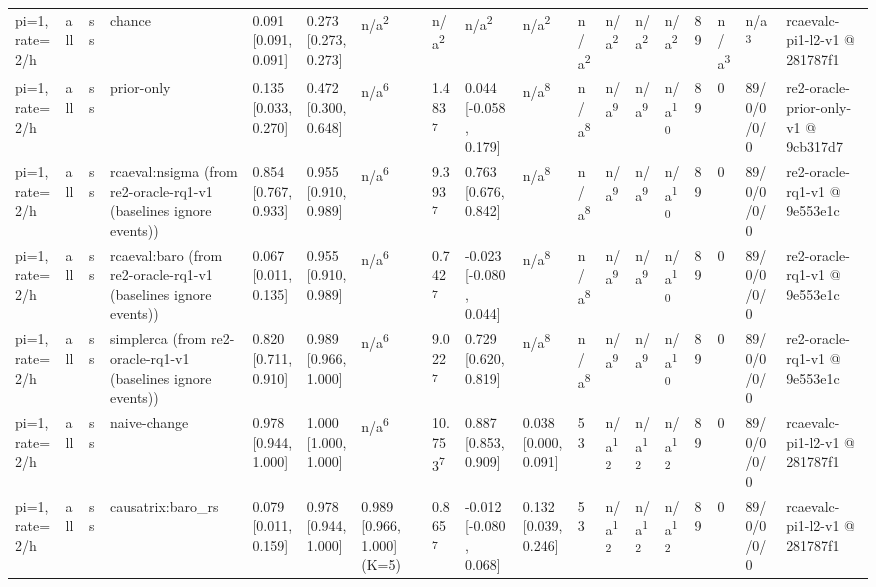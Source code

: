 \begin{table}[t]
\begin{tabular}{llllllllllllllllll}
pi=1, rate=2/h & all & ss & chance & 0.091 [0.091, 0.091] & 0.273 [0.273, 0.273] & n/a\textsuperscript{2} & n/a\textsuperscript{2} & n/a\textsuperscript{2} & n/a\textsuperscript{2} & n/a\textsuperscript{2} & n/a\textsuperscript{2} & n/a\textsuperscript{2} & n/a\textsuperscript{2} & 89 & n/a\textsuperscript{3} & n/a\textsuperscript{3} & rcaevalc-pi1-l2-v1 @ 281787f1 \\
pi=1, rate=2/h & all & ss & prior-only & 0.135 [0.033, 0.270] & 0.472 [0.300, 0.648] & n/a\textsuperscript{6} & 1.483\textsuperscript{7} & 0.044 [-0.058, 0.179] & n/a\textsuperscript{8} & n/a\textsuperscript{8} & n/a\textsuperscript{9} & n/a\textsuperscript{9} & n/a\textsuperscript{10} & 89 & 0 & 89/0/0/0/0 & re2-oracle-prior-only-v1 @ 9cb317d7 \\
pi=1, rate=2/h & all & ss & rcaeval:nsigma (from re2-oracle-rq1-v1 (baselines ignore events)) & 0.854 [0.767, 0.933] & 0.955 [0.910, 0.989] & n/a\textsuperscript{6} & 9.393\textsuperscript{7} & 0.763 [0.676, 0.842] & n/a\textsuperscript{8} & n/a\textsuperscript{8} & n/a\textsuperscript{9} & n/a\textsuperscript{9} & n/a\textsuperscript{10} & 89 & 0 & 89/0/0/0/0 & re2-oracle-rq1-v1 @ 9e553e1c \\
pi=1, rate=2/h & all & ss & rcaeval:baro (from re2-oracle-rq1-v1 (baselines ignore events)) & 0.067 [0.011, 0.135] & 0.955 [0.910, 0.989] & n/a\textsuperscript{6} & 0.742\textsuperscript{7} & -0.023 [-0.080, 0.044] & n/a\textsuperscript{8} & n/a\textsuperscript{8} & n/a\textsuperscript{9} & n/a\textsuperscript{9} & n/a\textsuperscript{10} & 89 & 0 & 89/0/0/0/0 & re2-oracle-rq1-v1 @ 9e553e1c \\
pi=1, rate=2/h & all & ss & simplerca (from re2-oracle-rq1-v1 (baselines ignore events)) & 0.820 [0.711, 0.910] & 0.989 [0.966, 1.000] & n/a\textsuperscript{6} & 9.022\textsuperscript{7} & 0.729 [0.620, 0.819] & n/a\textsuperscript{8} & n/a\textsuperscript{8} & n/a\textsuperscript{9} & n/a\textsuperscript{9} & n/a\textsuperscript{10} & 89 & 0 & 89/0/0/0/0 & re2-oracle-rq1-v1 @ 9e553e1c \\
pi=1, rate=2/h & all & ss & naive-change & 0.978 [0.944, 1.000] & 1.000 [1.000, 1.000] & n/a\textsuperscript{6} & 10.753\textsuperscript{7} & 0.887 [0.853, 0.909] & 0.038 [0.000, 0.091] & 53 & n/a\textsuperscript{12} & n/a\textsuperscript{12} & n/a\textsuperscript{12} & 89 & 0 & 89/0/0/0/0 & rcaevalc-pi1-l2-v1 @ 281787f1 \\
pi=1, rate=2/h & all & ss & causatrix:baro\_rs & 0.079 [0.011, 0.159] & 0.978 [0.944, 1.000] & 0.989 [0.966, 1.000] (K=5) & 0.865\textsuperscript{7} & -0.012 [-0.080, 0.068] & 0.132 [0.039, 0.246] & 53 & n/a\textsuperscript{12} & n/a\textsuperscript{12} & n/a\textsuperscript{12} & 89 & 0 & 89/0/0/0/0 & rcaevalc-pi1-l2-v1 @ 281787f1 \\

\end{tabular}
\end{table}
